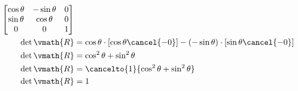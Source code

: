 \documentclass{gif7001}
\begin{document}
\begin{enumerate}
\begin{align*}
        \begin{bmatrix}
            \cos \theta & -\sin \theta & 0 \\
            \sin \theta & \cos \theta & 0 \\
            0 & 0 & 1 \\
        \end{bmatrix} \\
        \det \vmath{R} &= \cos \theta \cdot \left[\cos \theta \cancel{- 0}\right] - \left(- \sin \theta \right) \cdot \left[ \sin \theta \cancel{- 0} \right] \\
        \det \vmath{R} &= \cos^2 \theta + \sin^2 \theta \\
        \det \vmath{R} &= \cancelto{1}{\cos^2 \theta + \sin^2 \theta} \\
        \det \vmath{R} &= 1
    \end{align*}
\end{enumerate}
\end{document}

